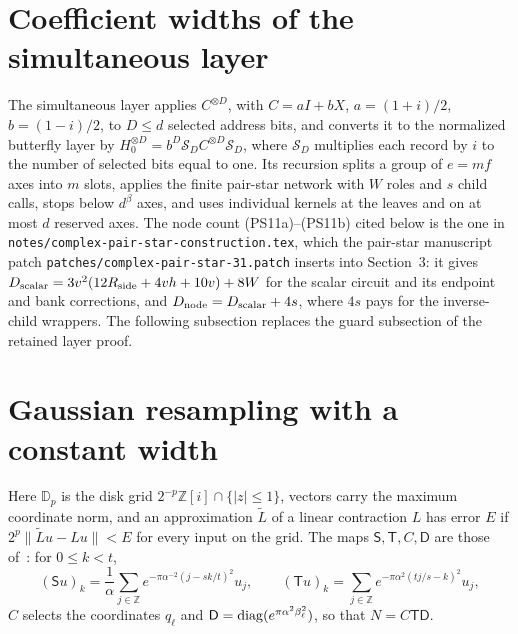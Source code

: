 \documentclass[11pt]{article}
\begin{document}
\section{Coefficient widths of the simultaneous layer}\label{sec:note-guard}
The simultaneous layer applies $C^{\otimes D}$, with
$C=aI+bX$, $a=(1+i)/2$, $b=(1-i)/2$, to $D\le d$ selected address bits, and
converts it to the normalized butterfly layer by
$H_0^{\otimes D}=b^D\mathcal S_DC^{\otimes D}\mathcal S_D$, where
$\mathcal S_D$ multiplies each record by $i$ to the number of selected bits
equal to one. Its recursion splits a group of $e=mf$ axes into $m$ slots,
applies the finite pair-star network with $W$ roles and $s$ child calls,
stops below $d^\beta$ axes, and uses individual kernels at the leaves and on
at most $d$ reserved axes. The node count (PS11a)--(PS11b) cited below is
the one in \texttt{notes/complex-pair-star-construction.tex}, which the
pair-star manuscript patch \texttt{patches/complex-pair-star-31.patch}
inserts into Section~3: it gives
$D_{\rm scalar}=3v^2(12R_{\rm side}+4vh+10v)+8W$ for the scalar circuit and
its endpoint and bank corrections, and $D_{\rm node}=D_{\rm scalar}+4s$,
where $4s$ pays for the inverse-child wrappers. The following subsection
replaces the guard subsection of the retained layer proof.



\section{Gaussian resampling with a constant width}\label{sec:note-resampling}
Here $\mathbb D_p$ is the disk grid $2^{-p}\mathbb Z[i]\cap\{|z|\le1\}$, vectors
carry the maximum coordinate norm, and an approximation $\widetilde L$ of a
linear contraction $L$ has error $E$ if $2^p\|\widetilde Lu-Lu\|<E$ for every
input on the grid. The maps $\mathsf S,\mathsf T,C,\mathsf D$ are those
of~\cite[Section~4]{HarveyHoeven2021}: for $0\le k<t$,
\[
 (\mathsf Su)_k=\frac1\alpha\sum_{j\in\mathbb Z}e^{-\pi\alpha^{-2}(j-sk/t)^2}u_j,
 \qquad
 (\mathsf Tu)_k=\sum_{j\in\mathbb Z}e^{-\pi\alpha^2(tj/s-k)^2}u_j,
\]
$C$ selects the coordinates $q_\ell$ and
$\mathsf D={\rm diag}(e^{\pi\alpha^2\beta_\ell^2})$, so that $N=C\mathsf T\mathsf D$.


\end{document}
